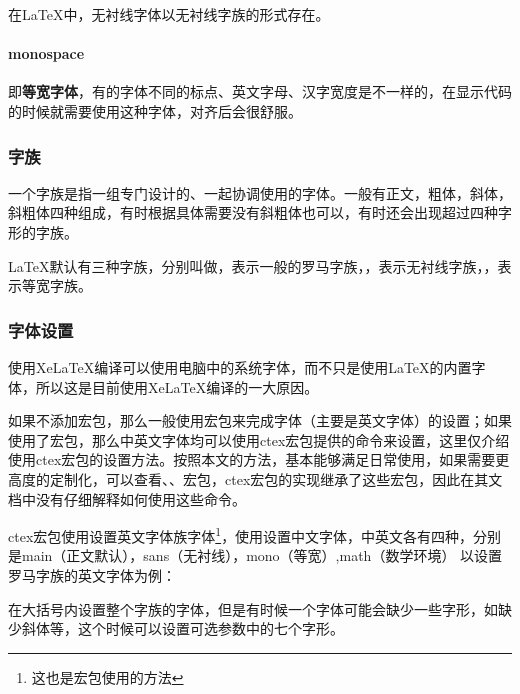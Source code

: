     在\LaTeX{}中，无衬线字体以无衬线字族的形式存在。
    \paragraph{monospace}
    即\textbf{等宽字体}，有的字体不同的标点、英文字母、汉字宽度是不一样的，在显示代码的时候就需要使用这种字体，对齐后会很舒服。

    
    \subsubsection{字族}
    一个字族是指一组专门设计的、一起协调使用的字体。一般有正文，粗体，斜体，斜粗体四种组成，有时根据具体需要没有斜粗体也可以，有时还会出现超过四种字形的字族。

    \LaTeX{}默认有三种字族，分别叫做，表示一般的罗马字族，，表示无衬线字族，，表示等宽字族。

    \subsubsection{字体设置}
    使用XeLaTeX编译可以使用电脑中的系统字体，而不只是使用\LaTeX{}的内置字体，所以这是目前使用XeLaTeX编译的一大原因。

    如果不添加宏包，那么一般使用宏包来完成字体（主要是英文字体）的设置；如果使用了宏包，那么中英文字体均可以使用ctex宏包提供的命令来设置，这里仅介绍使用ctex宏包的设置方法。按照本文的方法，基本能够满足日常使用，如果需要更高度的定制化，可以查看、、宏包，ctex宏包的实现继承了这些宏包，因此在其文档中没有仔细解释如何使用这些命令。

    ctex宏包使用设置英文字体族字体\footnote{这也是宏包使用的方法}，使用设置中文字体，中英文各有四种，分别是main（正文默认），sans（无衬线），mono（等宽）,math（数学环境）
    以设置罗马字族的英文字体为例：
    \begin{texcode}
        \setmainfont[UprightFont=xxx,
             BoldFont=xxx,
             ItalicFont=xxx,
             BoldItalicFont=xxx,
             SmallCapsFont=xxx,
             SlantedFont=xxx}
            ]{Latin Modern Roman}
    \end{texcode}

    在大括号内设置整个字族的字体，但是有时候一个字体可能会缺少一些字形，如缺少斜体等，这个时候可以设置可选参数中的七个字形。

